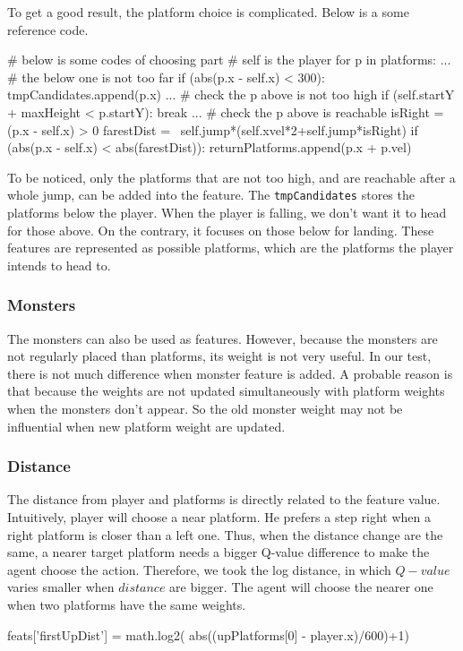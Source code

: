 \documentclass[final]{cvpr}
\begin{document}
   To get a good result, the platform choice is complicated. Below is a some reference code. 
\begin{python}
# below is some codes of choosing part
# self is the player
   for p in platforms:
      ...
      # the below one is not too far
      if (abs(p.x - self.x) < 300):
         tmpCandidates.append(p.x)
      ...
      # check the p above is not too high
      if (self.startY + maxHeight < p.startY):
         break
      ...
      # check the p above is reachable
      isRight = (p.x - self.x) > 0
      farestDist = \
      self.jump*(self.xvel*2+self.jump*isRight) 
      if (abs(p.x - self.x) < abs(farestDist)):
         returnPlatforms.append(p.x + p.vel)
\end{python}
   To be noticed, only the platforms that are not too high, and are reachable after a whole jump, can be added into the feature.
   The \verb|tmpCandidates| stores the platforms below the player. When the player is falling, we don't want it to head for those above.
   On the contrary, it focuses on those below for landing. 
   These features are represented as possible platforms, which are the platforms the player intends to head to.

\subsubsection{Monsters}
   The monsters can also be used as features. However, because the monsters are not regularly placed than platforms, its weight is not very useful.
   In our test, there is not much difference when monster feature is added. 
   A probable reason is that because the weights are not updated simultaneously with platform weights when the monsters don't appear.
   So the old monster weight may not be influential when new platform weight are updated.

\subsubsection{Distance}
   The distance from player and platforms is directly related to the feature value.
   Intuitively, player will choose a near platform. He prefers a step right when a right platform is closer than a left one.
   Thus, when the distance change are the same, a nearer target platform needs a bigger Q-value difference to make the agent choose the action.
   Therefore, we took the log distance, in which $Q-value$ varies smaller when $distance$ are bigger.
   The agent will choose the nearer one when two platforms have the same weights.
\begin{python}
   feats['firstUpDist'] = math.log2(
      abs((upPlatforms[0] - player.x)/600)+1) 
\end{python}
\end{document}
